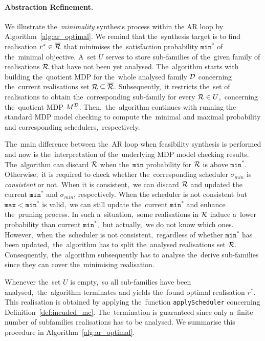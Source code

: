 \paragraph{Abstraction Refinement.}
We illustrate the~\textit{minimality} synthesis process within the AR loop by Algorithm~\ref{alg:ar_optimal}.
We remind that the~synthesis target is to find realisation $r^* \in \overline{\mathcal{R}}$ that minimises the~satisfaction probability $\mathtt{min^*}$ of the~minimal objective.
A~set $U$ serves to store sub-families of the~given family of realisations $\mathcal{R}$ that have not been yet analysed.
The~algorithm starts with building the~quotient MDP for the~whole analysed family $\mathcal{D}$ concerning the~current realisations set $\mathcal{R} \subseteq \overline{\mathcal{R}}$.
Subsequently,~it restricts the~set of realisations to obtain the~corresponding sub-family for every $\mathcal{R} \in U$,~concerning the~quotient MDP $M^{\mathcal{D}}$. 
Then,~the~algorithm continues with running the standard MDP model checking to compute the~minimal and maximal probability and corresponding schedulers,~respectively.

The~main difference between the~AR loop when feasibility synthesis is performed and now is the~interpretation of the~underlying MDP model checking results.
The~algorithm can discard $\mathcal{R}$ when the~$\mathtt{min}$ probability for $\mathcal{R}$ is above $\mathtt{min^*}$.
Otherwise,~it is required to check whether the~corresponding scheduler $\sigma_{min}$ is \textit{consistent} or not.
When it is consistent,~we can discard $\mathcal{R}$ and updated the current $\mathtt{min^*}$ and $\sigma_{min}$, respectively.
When the scheduler is not consistent but $\mathtt{max < min^*}$ is valid,~we can still update the~current $\mathtt{min^*}$ and enhance the~pruning process.
In such a~situation,~some realisations in $\mathcal{R}$ induce a~lower probability than current $\mathtt{min^*}$,~but actually,~we do not know which ones.
However,~when the~scheduler is not consistent,~regardless of whether $\mathtt{min^*}$ has been updated,~the~algorithm has to split the~analysed realisations set $\mathcal{R}$.
Consequently,~the~algorithm subsequently has to analyse the~derive sub-families since they can cover the~minimising realisation.

Whenever the~set $U$ is empty,~so all sub-families have been analysed,~the~algorithm terminates and yields the~found optimal realisation $r^*$.
This realisation is obtained by applying the~function \texttt{applyScheduler} concerning Definition~\ref{def:incuded_mc}.
The~termination is guaranteed since only a~finite number of subfamilies realisations has to be analysed.
We summarise this procedure in Algorithm~\ref{alg:ar_optimal}.

